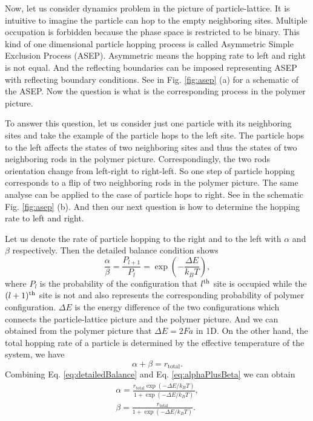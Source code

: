 Now, let us consider dynamics problem in the picture of particle-lattice. It is intuitive to imagine the particle can hop to the empty neighboring sites. Multiple occupation is forbidden because the phase space is restricted to be binary. This kind of one dimensional particle hopping process is called Asymmetric Simple Exclusion Process (ASEP). Asymmetric means the hopping rate to left and right is not equal. And the reflecting boundaries can be imposed representing ASEP with reflecting boundary conditions. See in Fig. \ref{fig:asep} (a) for a schematic of the ASEP. Now the question is what is the corresponding process in the polymer picture. 

To answer this question, let us consider just one particle with its neighboring sites and take the example of the particle hops to the left site. The particle hops to the left affects the states of two neighboring sites and thus the states of two neighboring rods in the polymer picture. Correspondingly, the two rods orientation change from left-right to right-left. So one step of particle hopping corresponds to a flip of two neighboring rods in the polymer picture. The same analyse can be applied to the case of particle hops to right. See in the schematic Fig. \ref{fig:asep} (b). And then our next question is how to determine the hopping rate to left and right. 

Let us denote the rate of particle hopping to the right and to the left with $\alpha$ and $\beta$ respectively. Then the detailed balance condition shows
\begin{equation}
    \label{eq:detailedBalance}
    \frac{\alpha}{\beta} = \frac{P_{l+1}}{P_{l}} = \exp\left(-\frac{\Delta E}{k_B T}\right),
\end{equation}
where $P_l$ is the probability of the configuration that $l^{\rm{th}}$ site is occupied while the $(l+1)^{\rm{th}}$ site is not and also represents the corresponding probability of polymer configuration. $\Delta E$ is the energy difference of the two configurations which connects the particle-lattice picture and the polymer picture. And we can obtained from the polymer picture that $\Delta E = 2Fa$ in 1D. On the other hand, the total hopping rate of a particle is determined by the effective temperature of the system, we have 
\begin{equation}
    \label{eq:alphaPlusBeta}
    \alpha + \beta = r_{\text{total}}. 
\end{equation}
Combining Eq. \eqref{eq:detailedBalance} and Eq. \eqref{eq:alphaPlusBeta} we can obtain
\begin{subequations}
    \begin{align}
        \label{eq:hoppingRate}
        \alpha  =   \frac{r_{\text{total}}\exp{(-\Delta E / k_B T)}}{1+\exp{(- \Delta E / k_B T)}}, \\
        \beta  =  \frac{r_{\text{total}}}{1+\exp{(- \Delta E / k_B T)}}.
    \end{align}
\end{subequations}

